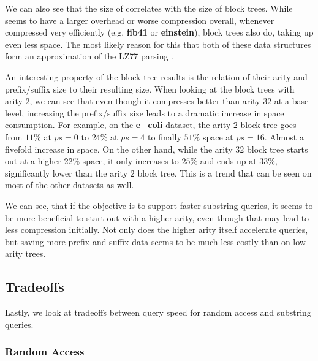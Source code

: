 \documentclass{scrartcl}
\begin{document}
We can also see that the size of \lzend{} correlates with the size of block trees.
While \lzend{} seems to have a larger overhead or worse compression overall, whenever \lzend{} compressed very efficiently (e.g. \textbf{fib41} or \textbf{einstein}),
block trees also do, taking up even less space.
The most likely reason for this that both of these data structures form an approximation of the LZ77 parsing \cite{ziv_universal_1977,belazzougui_block_2021,kempa_lz-end_2017}.

An interesting property of the block tree results is the relation of their arity and prefix/suffix size to their resulting size.
When looking at the block trees with arity $2$, we can see that even though it compresses better than arity $32$ at a base level,
increasing the prefix/suffix size leads to a dramatic increase in space consumption.
For example, on the \textbf{e\_coli} dataset, the arity $2$ block tree goes from $11\%$ at $ps = 0$ to $24\%$ at $ps=4$ to finally $51\%$ space at $ps=16$.
Almost a fivefold increase in space.
On the other hand, while the arity $32$ block tree starts out at a higher $22\%$ space, it only increases to $25\%$ and ends up at $33\%$, significantly lower than the arity $2$ block tree.
This is a trend that can be seen on most of the other datasets as well.

We can see, that if the objective is to support faster substring queries, it seems to be more beneficial to start out with a higher arity, even though that may lead to less compression initially.
Not only does the higher arity itself accelerate queries, but saving more prefix and suffix data seems to be much less costly than on low arity trees.

\subsection{Tradeoffs}

Lastly, we look at tradeoffs between query speed for random access and substring queries.


\subsubsection{Random Access}
\end{document}
